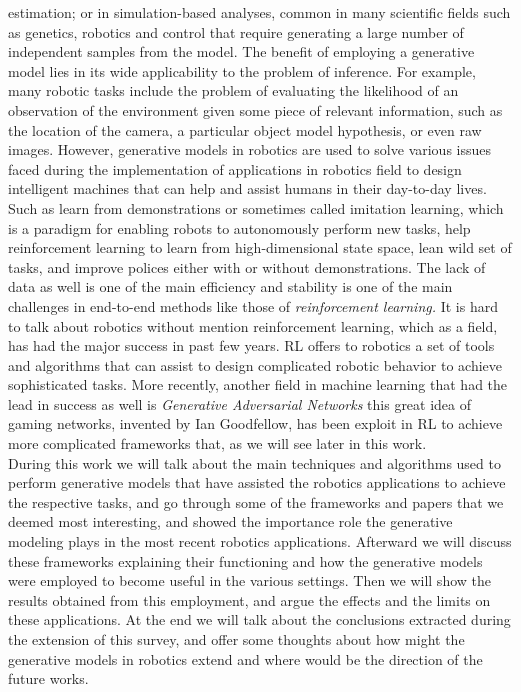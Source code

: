 estimation; or in simulation-based analyses, common in many scientific fields such as genetics, robotics and control that require generating a large number of independent samples from the model. The benefit of employing a generative model lies in its wide applicability to the problem of inference. For example, many robotic tasks include the problem of evaluating the likelihood of an observation of the environment given some piece of relevant information, such as the location of the camera, a particular object model hypothesis, or even raw images. However, generative models in robotics are used to solve various issues faced during the implementation of applications in robotics field to design intelligent machines that can help and assist humans in their day-to-day lives. Such as learn from demonstrations or sometimes called imitation learning, which is a paradigm for enabling robots to autonomously perform new tasks, help reinforcement learning to learn from high-dimensional state space, lean wild set of tasks, and improve polices either with or without demonstrations. The lack of data as well is one of the main efficiency and stability is one of the main challenges in end-to-end methods like those of\textit{ \textacutedbl reinforcement learning\textgravedbl.} It is hard to talk about robotics without mention reinforcement learning, which as a field, has had the major success in past few years. RL offers to robotics a set of tools and algorithms that can assist to design complicated robotic behavior to achieve sophisticated tasks. More recently, another field in machine learning that had the lead in success as well is\textit{ \textacutedbl Generative Adversarial Networks\textgravedbl} this great idea of gaming networks, invented by Ian Goodfellow, has been exploit in RL to achieve more complicated frameworks that, as we will see later in this work.
\\During this work we will talk about the main techniques and algorithms used to perform generative models that have assisted the robotics applications to achieve the respective tasks, and go through some of the frameworks and papers that we deemed most interesting, and showed the importance role the generative modeling plays in the most recent robotics applications. Afterward we will discuss these frameworks explaining their functioning and how the generative models were employed to become useful in the various settings. Then we will show the results obtained from this employment, and argue the effects and the limits on these applications. At the end we will talk about the conclusions extracted during the extension of this survey, and offer some thoughts about how might the generative models in robotics extend and where would be the direction of the future works.


\clearpage{\pagestyle{empty}\cleardoublepage}
